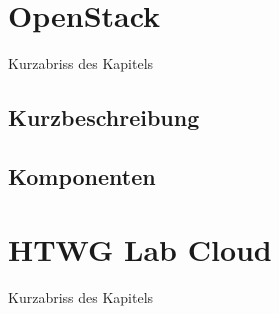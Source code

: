 


\newcommand{\thema}{HTWG Lab Cloud mit OpenStack}
\newcommand{\zusammenfassung}{Hier kommt eine kurze Zusammenfassung der Arbeit}

\newcommand{\ausgabedatum}{}
\newcommand{\abgabedatum}{}
\newcommand{\autor}{Dennis Parlak, Simon Kessler, Tobias Keh, Marco Grupe}
\newcommand{\autorStrasse}{}
\newcommand{\autorPLZ}{}
\newcommand{\autorOrt}{}
\newcommand{\autorGeburtsort}{}
\newcommand{\autorGeburtsdatum}{}
\newcommand{\prueferA}{Prof. Dr. Hanno Langweg}
\newcommand{\prueferB}{}
\newcommand{\firma}{}
\newcommand{\studiengang}{MSI Informatik}

\raggedbottom 

\frontmatter


\setcounter{tocdepth}{1}
\tableofcontents 
\listoffigures
\listoftables
%
\mainmatter
{}
		
\chapter{OpenStack}

Kurzabriss des Kapitels

\section{Kurzbeschreibung}

\section{Komponenten}

\chapter{HTWG Lab Cloud}

Kurzabriss des Kapitels

